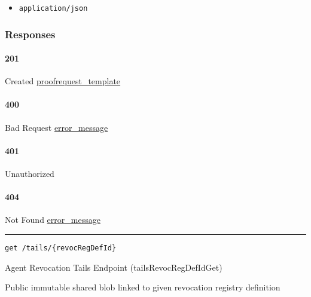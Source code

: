 \begin{itemize}
\tightlist
\item
  \texttt{application/json}
\end{itemize}

\hypertarget{responses-108}{%
\subsubsection{Responses}\label{responses-108}}

\hypertarget{section-353}{%
\paragraph{201}\label{section-353}}

Created
\protect\hyperlink{proofrequest_template}{proofrequest\_template}

\hypertarget{section-354}{%
\paragraph{400}\label{section-354}}

Bad Request \protect\hyperlink{error_message}{error\_message}

\hypertarget{section-355}{%
\paragraph{401}\label{section-355}}

Unauthorized \protect\hyperlink{}{}

\hypertarget{section-356}{%
\paragraph{404}\label{section-356}}

Not Found \protect\hyperlink{error_message}{error\_message}

\begin{center}\rule{0.5\linewidth}{\linethickness}\end{center}

\protect\hypertarget{tailsRevocRegDefIdGet}{}{}

\begin{verbatim}
get /tails/{revocRegDefId}
\end{verbatim}

Agent Revocation Tails Endpoint ({tailsRevocRegDefIdGet})

Public immutable shared blob linked to given revocation registry
definition


